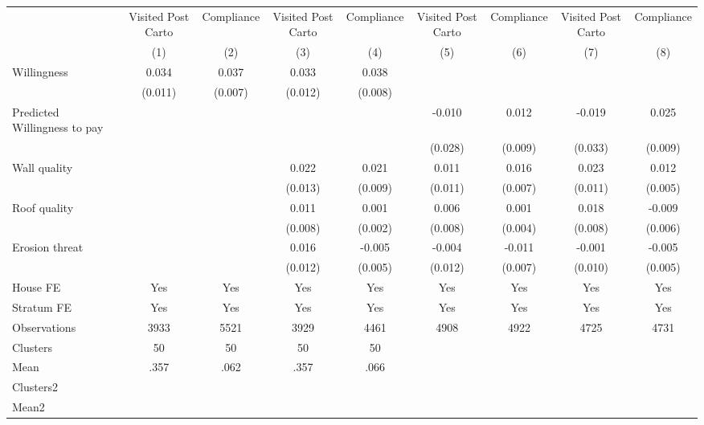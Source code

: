 \begin{tabular}{l*{8}{c}}
\toprule
                &\multicolumn{1}{c}{Visited Post Carto}&\multicolumn{1}{c}{Compliance}&\multicolumn{1}{c}{Visited Post Carto}&\multicolumn{1}{c}{Compliance}&\multicolumn{1}{c}{Visited Post Carto}&\multicolumn{1}{c}{Compliance}&\multicolumn{1}{c}{Visited Post Carto}&\multicolumn{1}{c}{Compliance}\\
                &\multicolumn{1}{c}{(1)}&\multicolumn{1}{c}{(2)}&\multicolumn{1}{c}{(3)}&\multicolumn{1}{c}{(4)}&\multicolumn{1}{c}{(5)}&\multicolumn{1}{c}{(6)}&\multicolumn{1}{c}{(7)}&\multicolumn{1}{c}{(8)}\\
\midrule
Willingness     &    0.034&    0.037&    0.033&    0.038&         &         &         &         \\
                &  (0.011)&  (0.007)&  (0.012)&  (0.008)&         &         &         &         \\
Predicted Willingness to pay&         &         &         &         &   -0.010&    0.012&   -0.019&    0.025\\
                &         &         &         &         &  (0.028)&  (0.009)&  (0.033)&  (0.009)\\
Wall quality    &         &         &    0.022&    0.021&    0.011&    0.016&    0.023&    0.012\\
                &         &         &  (0.013)&  (0.009)&  (0.011)&  (0.007)&  (0.011)&  (0.005)\\
Roof quality    &         &         &    0.011&    0.001&    0.006&    0.001&    0.018&   -0.009\\
                &         &         &  (0.008)&  (0.002)&  (0.008)&  (0.004)&  (0.008)&  (0.006)\\
Erosion threat  &         &         &    0.016&   -0.005&   -0.004&   -0.011&   -0.001&   -0.005\\
                &         &         &  (0.012)&  (0.005)&  (0.012)&  (0.007)&  (0.010)&  (0.005)\\
House FE        &      Yes&      Yes&      Yes&      Yes&      Yes&      Yes&      Yes&      Yes\\
Stratum FE      &      Yes&      Yes&      Yes&      Yes&      Yes&      Yes&      Yes&      Yes\\
\midrule
Observations    &     3933&     5521&     3929&     4461&     4908&     4922&     4725&     4731\\
Clusters        &       50&       50&       50&       50&         &         &         &         \\
Mean            &     .357&     .062&     .357&     .066&         &         &         &         \\
Clusters2       &         &         &         &         &         &         &         &         \\
Mean2           &         &         &         &         &         &         &         &         \\
\bottomrule
\end{tabular}
